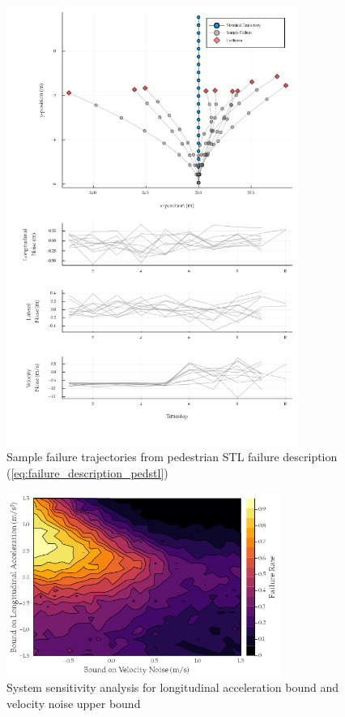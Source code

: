 \begin{figure}
    \includegraphics[width=0.85\textwidth]{figures/interpretable_validation/stl_failure_examples.png}
    \caption{Sample failure trajectories from pedestrian STL failure description (\cref{eq:failure_description_pedstl})}
    \label{fig:ped_stl_sample_failures}
\end{figure}


\begin{figure}
    \centering
    \includegraphics[width=0.8\textwidth]{figures/interpretable_validation/stl_result_sensitivity.png}
    \caption{System sensitivity analysis for longitudinal acceleration bound and velocity noise upper bound}
    \label{fig:stl_ped_sensititivty}
\end{figure}

